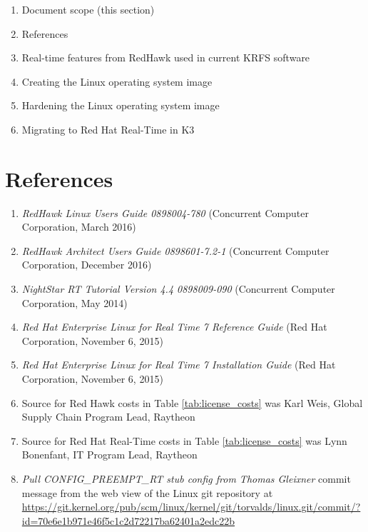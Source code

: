 \documentclass[12pt]{article}
\begin{document}
\begin{enumerate}
    \item Document scope (this section)
    \item References
    \item Real-time features from RedHawk used in current KRFS software
    \item Creating the Linux operating system image
    \item Hardening the Linux operating system image
    \item Migrating to Red Hat Real-Time in K3
\end{enumerate}



%
\newpage
\section{References}

\begin{enumerate}
    \item \textit{RedHawk Linux Users Guide 0898004-780} (Concurrent Computer Corporation, March 2016) \label{ref:red_hawk_guide}
    \item \textit{RedHawk Architect Users Guide 0898601-7.2-1} (Concurrent Computer Corporation, December 2016) \label{ref:architect}
    \item \textit{NightStar RT Tutorial Version 4.4 0898009-090} (Concurrent Computer Corporation, May 2014) \label{ref:nightstar}
    \item \textit{Red Hat Enterprise Linux for Real Time 7 Reference Guide} (Red Hat Corporation, November 6, 2015) \label{ref:rhel7_ref}
    \item \textit{Red Hat Enterprise Linux for Real Time 7 Installation Guide} (Red Hat Corporation, November 6, 2015) \label{ref:rhel7_install}
    \item Source for Red Hawk costs in Table \ref{tab:license_costs} was Karl Weis, Global Supply Chain Program Lead, Raytheon \label{ref:karl}
    \item Source for Red Hat Real-Time costs in Table \ref{tab:license_costs} was Lynn Bonenfant, IT Program Lead, Raytheon \label{ref:lynn}
    \item \textit{Pull CONFIG\_PREEMPT\_RT stub config from Thomas Gleixner} commit message from the web view of the Linux git repository at \url{https://git.kernel.org/pub/scm/linux/kernel/git/torvalds/linux.git/commit/?id=70e6e1b971e46f5c1c2d72217ba62401a2edc22b} \label{ref:commit}
\end{enumerate}
\end{document}
